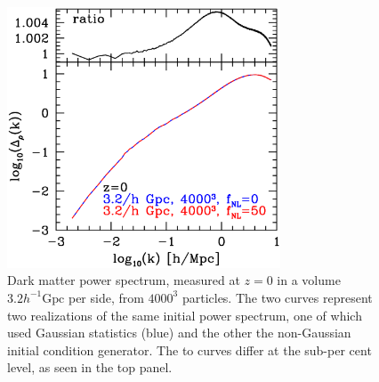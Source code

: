 \begin{figure}%
  \begin{center}
    \includegraphics[width=3.2in]{graphs/dm_power_z0_fNL0_50.eps}
  \caption{ Dark matter power spectrum, measured at $z=0$ in a volume $3.2 h^{-1}\mbox{Gpc}$ per side,
  from $4000^3$ particles. The two curves represent two realizations of the same initial power spectrum, one of which used Gaussian statistics (blue) and the other the non-Gaussian initial condition generator. The to curves differ at the sub-per cent level, as seen in the top panel.   
    \label{fig:init}}
\end{center}
\end{figure}


